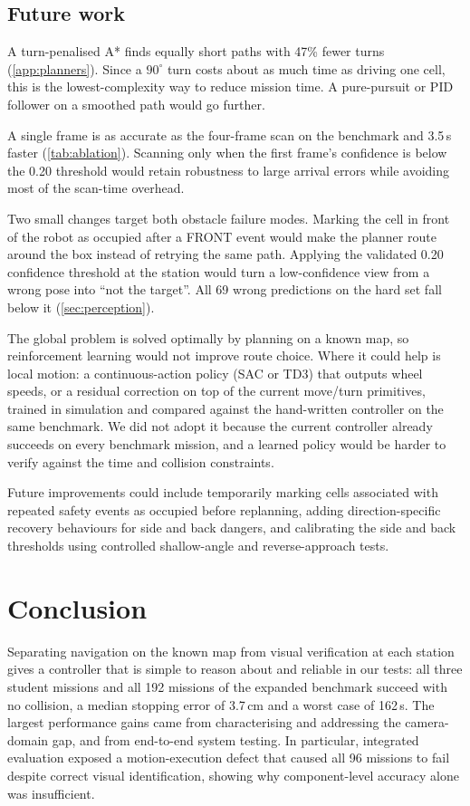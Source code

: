 \subsection{Future work}
 A turn-penalised A* finds equally short paths with 47\% fewer turns (\cref{app:planners}). Since a $90^\circ$ turn costs about as much time as driving one cell, this is the lowest-complexity way to reduce mission time. A pure-pursuit or PID follower on a smoothed path would go further.

 A single frame is as accurate as the four-frame scan on the benchmark and 3.5\,s faster (\cref{tab:ablation}). Scanning only when the first frame's confidence is below the 0.20 threshold would retain robustness to large arrival errors while avoiding most of the scan-time overhead.

 Two small changes target both obstacle failure modes. Marking the cell in front of the robot as occupied after a FRONT event would make the planner route around the box instead of retrying the same path. Applying the validated 0.20 confidence threshold at the station would turn a low-confidence view from a wrong pose into ``not the target''. All 69 wrong predictions on the hard set fall below it (\cref{sec:perception}).

 The global problem is solved optimally by planning on a known map, so reinforcement learning would not improve route choice. Where it could help is local motion: a continuous-action policy (SAC or TD3) that outputs wheel speeds, or a residual correction on top of the current move/turn primitives, trained in simulation and compared against the hand-written controller on the same benchmark. We did not adopt it because the current controller already succeeds on every benchmark mission, and a learned policy would be harder to verify against the time and collision constraints.

Future improvements could include temporarily marking cells associated with repeated safety events as occupied before replanning, adding direction-specific recovery behaviours for side and back dangers, and calibrating the side and back thresholds using controlled shallow-angle and reverse-approach tests.

\section{Conclusion}
Separating navigation on the known map from visual verification at each station gives a controller that is simple to reason about and reliable in our tests: all three student missions and all 192 missions of the expanded benchmark succeed with no collision, a median stopping error of 3.7\,cm and a worst case of 162\,s. The largest performance gains came from characterising and addressing the camera-domain gap, and from end-to-end system testing. In particular, integrated evaluation exposed a motion-execution defect that caused all 96 missions to fail despite correct visual identification, showing why component-level accuracy alone was insufficient.

